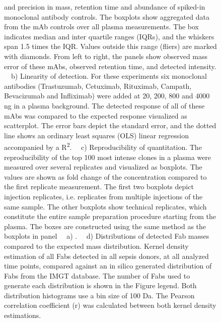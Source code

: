 \begin{subappendices}
\begin{figure}[t!]
{      and precision in mass, retention time and abundance of spiked-in monoclonal antibody controls. The boxplots show aggregated data from the mAb controls over all plasma measurements. The box indicates median and inter quartile ranges (IQRs), and the whiskers span 1.5 times the IQR. Values outside this range (fliers) are marked with diamonds. From left to right, the panels show observed mass error of these mAbs, observed retention time, and detected intensity. ~~b) Linearity of detection. For these experiments six monoclonal antibodies (Trastuzumab, Cetuximab, Rituximab, Campath, Bevacizumab and Infliximab) were added at 20, 200, 800 and 4000 ng in a plasma background. The detected response of all of these mAbs was compared to the expected response visualized as scatterplot. The error bars depict the standard error, and the dotted line shows an ordinary least squares (OLS) linear regression accompanied by a R\textsuperscript{2}. ~~c) Reproducibility of quantitation. The reproducibility of the top 100 most intense clones in a plasma were measured over several replicates and visualized as boxplots. The values are shown as fold change of the concentration compared to the first replicate measurement. The first two boxplots depict injection replicates, i.e. replicates from multiple injections of the same sample. The other boxplots show technical replicates, which constitute the entire sample preparation procedure starting from the plasma. The boxes are constructed using the same method as the boxplots in panel ~~a) . ~~d) Distributions of detected Fab masses compared to the expected mass distribution. Kernel density estimation of all Fabs detected in all sepsis donors, at all analyzed time points, compared against an in silico generated distribution of Fabs from the IMGT database. The number of Fabs used to generate each distribution is shown in the Figure legend. Both distribution histograms use a bin size of 100 Da. The Pearson correlation coefficient (r) was calculated between both kernel density estimations.
    }
    \vspace{24cm}
  \end{figure}


\end{subappendices}
